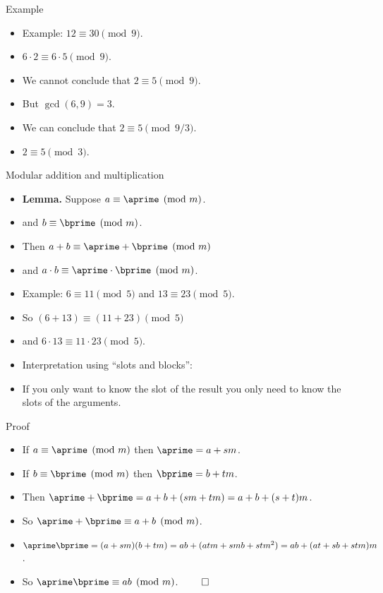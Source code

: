 \documentclass[handout]{beamer}
\begin{document}
\begin{frame}{Example}
\begin{itemize}
  \item Example: $12 \equiv 30 \pmod {9}$.
  \item $6 \cdot 2 \equiv 6 \cdot 5 \pmod {9}$.
  \item We cannot conclude that $2\equiv 5 \pmod {9}$.
  \item But $\gcd(6,9) = 3$.
  \item We can conclude that $2\equiv 5 \pmod {9/3}$.
  \item $2\equiv 5 \pmod 3$.
\end{itemize}
\end{frame}

\begin{frame}{Modular addition and multiplication}
\begin{itemize}
  \item \textbf{Lemma.} Suppose $a \equiv \aprime \pmod {m}$.
  \item and $b  \equiv \bprime \pmod {m}$.
  \item Then $a+b \equiv \aprime + \bprime \pmod {m}$
  \item and $a \cdot b \equiv \aprime \cdot \bprime \pmod {m}$.
  \item Example: $6 \equiv 11 \pmod 5$ and $13\equiv 23 \pmod 5$.
  \item So $(6+13) \equiv (11 +23) \pmod 5$
  \item and  $6\cdot 13 \equiv 11\cdot 23 \pmod 5$.
  \item Interpretation using ``slots and blocks'':
  \item If you only want to know the slot
  of the result you only need to know the slots of the arguments.
\end{itemize}
\end{frame}

\begin{frame}{Proof}
\begin{itemize}
  \item If $a\equiv \aprime \pmod m$ then $\aprime = a + sm$.
  \item If $b \equiv \bprime \pmod m$ then $\bprime = b + tm$.
  \item Then $\aprime+\bprime = a+b + (sm + tm) = a+b +(s+t)m$.
  \item So $\aprime + \bprime \equiv a+b \pmod m$.
  \item $\aprime\bprime = (a+sm)(b+tm) = ab + (atm + smb + stm^2) = ab + (at+sb+stm)m$.
  \item So $\aprime\bprime \equiv ab \pmod m$. $\qed$
\end{itemize}
\end{frame}
\end{document}
